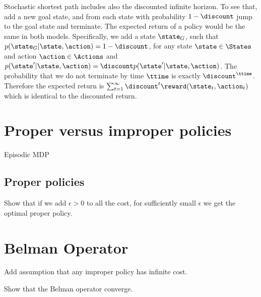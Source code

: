 Stochastic shortest path includes also the discounted infinite
horizon. To see that, add a new goal state, and from each state with
probability $1-\discount$ jump to the goal state and terminate. The
expected return of a policy would be the same in both models.
Specifically, we add a state $\state_G$, such that
$p(\state_G|\state,\action)=1-\discount$, for any state
$\state\in\States$ and action $\action\in\Actions$ and
$p(\state'|\state,\action)=\discount p(\state'|\state,\action)$. The
probability that we do not terminate by time $\ttime$ is exactly
$\discount^\ttime$. Therefore the expected return is
$\sum_{t=1}^\infty \discount^t\reward(\state_t,\action_t)$ which is
identical to the discounted return.

\section{Proper versus improper policies}

Episodic MDP

\subsection{Proper policies}

Show that if we add $\epsilon>0$ to all the cost, for sufficiently small $\epsilon$ we get the optimal proper policy.

\section{Belman Operator}

Add assumption that any improper policy has infinite cost.

Show that the Belman operator converge.
